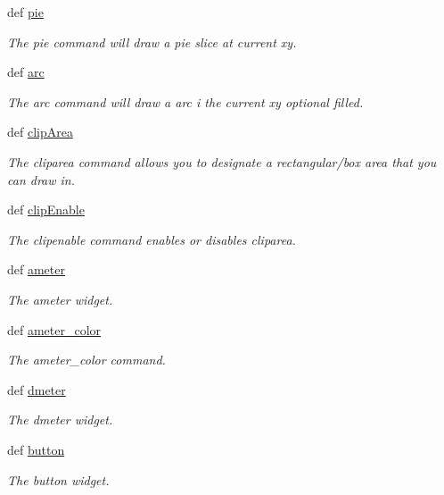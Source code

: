 \begin{DoxyCompactItemize}
def \hyperlink{group___drawing_gadc61344b718ac7728cad63f85a9712d5}{pie}
\begin{DoxyCompactList}\small\item\em The pie command will draw a pie slice at current xy. \end{DoxyCompactList}\item 
def \hyperlink{group___drawing_gac515d84e432747e244699747380556ea}{arc}
\begin{DoxyCompactList}\small\item\em The arc command will draw a arc i the current xy optional filled. \end{DoxyCompactList}\item 
def \hyperlink{group___drawing_ga5615763ecf3b2d679d4f4a6e0ac14244}{clip\-Area}
\begin{DoxyCompactList}\small\item\em The cliparea command allows you to designate a rectangular/box area that you can draw in. \end{DoxyCompactList}\item 
def \hyperlink{group___drawing_ga3859a82b98a732f214ca4e94bf90e16a}{clip\-Enable}
\begin{DoxyCompactList}\small\item\em The clipenable command enables or disables cliparea. \end{DoxyCompactList}\item 
def \hyperlink{group___widgets_ga437287c80e84027b6b9bebfe31764202}{ameter}
\begin{DoxyCompactList}\small\item\em The ameter widget. \end{DoxyCompactList}\item 
def \hyperlink{group___widgets_gabe969d0e420d69f79a659f115e810acd}{ameter\-\_\-color}
\begin{DoxyCompactList}\small\item\em The ameter\-\_\-color command. \end{DoxyCompactList}\item 
def \hyperlink{group___widgets_gae047f70bd7485eafe1e352282cf3c999}{dmeter}
\begin{DoxyCompactList}\small\item\em The dmeter widget. \end{DoxyCompactList}\item 
def \hyperlink{group___widgets_ga6ce046794cbbfa9236c745b712fd2d6d}{button}
\begin{DoxyCompactList}\small\item\em The button widget. \end{DoxyCompactList}\item 

\end{DoxyCompactItemize}
